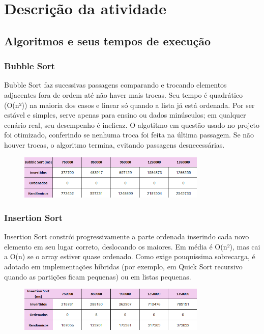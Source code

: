 \documentclass[a4paper, 12pt]{article}
\begin{document}
\section{Descrição da atividade}
    \subsection{Algoritmos e seus tempos de execução}
        \subsubsection{Bubble Sort}
            Bubble Sort faz sucessivas passagens comparando e trocando elementos adjacentes fora de ordem até não haver mais trocas. Seu tempo é quadrático (O(n²)) na maioria dos casos e linear só quando a lista já está ordenada. Por ser estável e simples, serve apenas para ensino ou dados minúsculos; em qualquer cenário real, seu desempenho é ineficaz. O algotitmo em questão usado no projeto foi otimizado, conferindo se nenhuma troca foi feita na última passagem. Se não houver trocas, o algoritmo termina, evitando passagens desnecessárias.

            \begin{figure}[ht]
                \centering
                \includegraphics[width=0.8\textwidth]{images/bubble.png}
            \end{figure}

        \subsubsection{Insertion Sort}
            Insertion Sort constrói progressivamente a parte ordenada inserindo cada novo elemento em seu lugar correto, deslocando os maiores. Em média é O(n²), mas cai a O(n) se o array estiver quase ordenado. Como exige pouquíssima sobrecarga, é adotado em implementações híbridas (por exemplo, em Quick Sort recursivo quando as partições ficam pequenas) ou em listas pequenas.

            \begin{figure}[ht]
                \centering
                \includegraphics[width=0.8\textwidth]{images/insertion.png}
            \end{figure}
\end{document}
